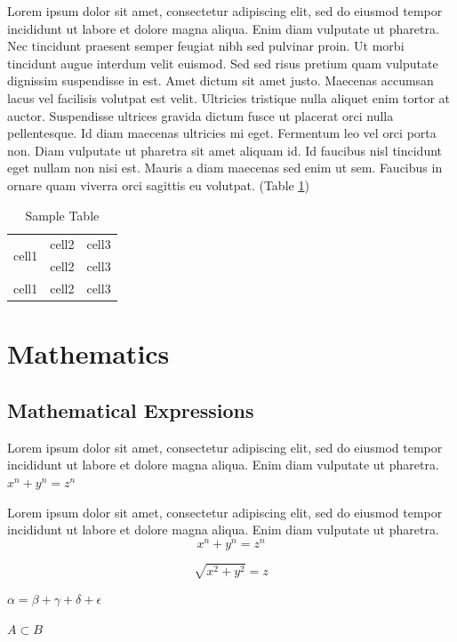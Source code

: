 \documentclass[a4paper, 12pt]{report}
\begin{document}
\vspace{0.75cm}

Lorem ipsum dolor sit amet, consectetur adipiscing elit, sed do eiusmod tempor incididunt ut labore et dolore magna aliqua. Enim diam vulputate ut pharetra. Nec tincidunt praesent semper feugiat nibh sed pulvinar proin. Ut morbi tincidunt augue interdum velit euismod. Sed sed risus pretium quam vulputate dignissim suspendisse in est. Amet dictum sit amet justo. Maecenas accumsan lacus vel facilisis volutpat est velit. Ultricies tristique nulla aliquet enim tortor at auctor. Suspendisse ultrices gravida dictum fusce ut placerat orci nulla pellentesque. Id diam maecenas ultricies mi eget. Fermentum leo vel orci porta non. Diam vulputate ut pharetra sit amet aliquam id. Id faucibus nisl tincidunt eget nullam non nisi est. Mauris a diam maecenas sed enim ut sem. Faucibus in ornare quam viverra orci sagittis eu volutpat.
(Table \ref{tab:sample_table})

\begin{table}[h]
	\centering
	\begin{tabular}{|c|c|c|}
		\hline
		\multirow{2}{5em}{cell1} & cell2 & cell3 \\
	 	& cell2 & cell3 \\
		\hline
		cell1 & cell2 & cell3 \\
		\hline
	\end{tabular}
	\caption{Sample Table}
	\label{tab:sample_table}
\end{table}



\chapter{Mathematics}
\section{Mathematical Expressions}
Lorem ipsum dolor sit amet, consectetur adipiscing elit, sed do eiusmod tempor incididunt ut labore et dolore magna aliqua. Enim diam vulputate ut pharetra.
$x^n + y^n = z^n$

Lorem ipsum dolor sit amet, consectetur adipiscing elit, sed do eiusmod tempor incididunt ut labore et dolore magna aliqua. Enim diam vulputate ut pharetra.
\[x^n + y^n = z^n\]

\[\sqrt{x^2 + y^2} = z\]

\( \alpha = \beta + \gamma + \delta + \epsilon \)

\( A \subset B \)
\end{document}
